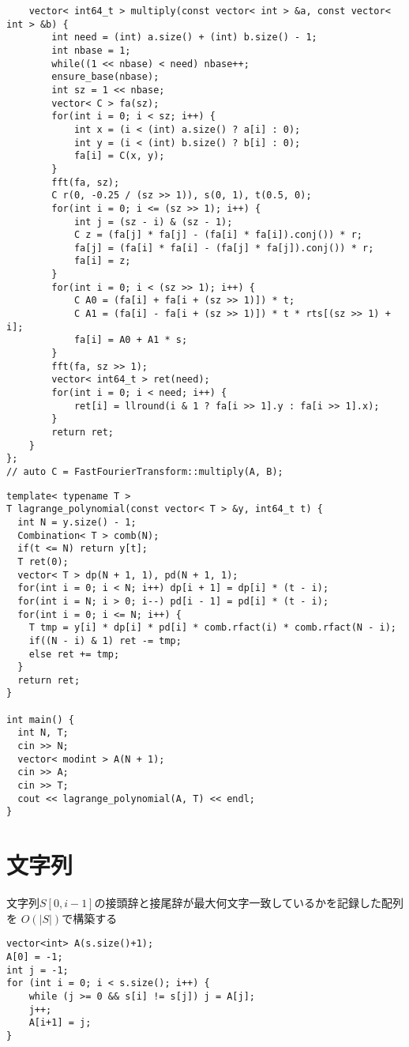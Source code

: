 \documentclass[11pt,a4paper]{jsarticle}
\newcommand{\minititle}[1]{\medskip{\large \sf #1}\medskip}
\begin{document}
\begin{lstlisting}
    vector< int64_t > multiply(const vector< int > &a, const vector< int > &b) {
        int need = (int) a.size() + (int) b.size() - 1;
        int nbase = 1;
        while((1 << nbase) < need) nbase++;
        ensure_base(nbase);
        int sz = 1 << nbase;
        vector< C > fa(sz);
        for(int i = 0; i < sz; i++) {
            int x = (i < (int) a.size() ? a[i] : 0);
            int y = (i < (int) b.size() ? b[i] : 0);
            fa[i] = C(x, y);
        }
        fft(fa, sz);
        C r(0, -0.25 / (sz >> 1)), s(0, 1), t(0.5, 0);
        for(int i = 0; i <= (sz >> 1); i++) {
            int j = (sz - i) & (sz - 1);
            C z = (fa[j] * fa[j] - (fa[i] * fa[i]).conj()) * r;
            fa[j] = (fa[i] * fa[i] - (fa[j] * fa[j]).conj()) * r;
            fa[i] = z;
        }
        for(int i = 0; i < (sz >> 1); i++) {
            C A0 = (fa[i] + fa[i + (sz >> 1)]) * t;
            C A1 = (fa[i] - fa[i + (sz >> 1)]) * t * rts[(sz >> 1) + i];
            fa[i] = A0 + A1 * s;
        }
        fft(fa, sz >> 1);
        vector< int64_t > ret(need);
        for(int i = 0; i < need; i++) {
            ret[i] = llround(i & 1 ? fa[i >> 1].y : fa[i >> 1].x);
        }
        return ret;
    }
};
// auto C = FastFourierTransform::multiply(A, B);
\end{lstlisting}

\minititle{Lagrange補間}
\begin{lstlisting}
template< typename T >
T lagrange_polynomial(const vector< T > &y, int64_t t) {
  int N = y.size() - 1;
  Combination< T > comb(N);
  if(t <= N) return y[t];
  T ret(0);
  vector< T > dp(N + 1, 1), pd(N + 1, 1);
  for(int i = 0; i < N; i++) dp[i + 1] = dp[i] * (t - i);
  for(int i = N; i > 0; i--) pd[i - 1] = pd[i] * (t - i);
  for(int i = 0; i <= N; i++) {
    T tmp = y[i] * dp[i] * pd[i] * comb.rfact(i) * comb.rfact(N - i);
    if((N - i) & 1) ret -= tmp;
    else ret += tmp;
  }
  return ret;
}

int main() {
  int N, T;
  cin >> N;
  vector< modint > A(N + 1);
  cin >> A;
  cin >> T;
  cout << lagrange_polynomial(A, T) << endl;
}
\end{lstlisting}

\section{文字列}
\minititle{KMP法}

文字列$S[0,i-1]$の接頭辞と接尾辞が最大何文字一致しているかを記録した配列を $O(|S|)$で構築する
\begin{lstlisting}
vector<int> A(s.size()+1);
A[0] = -1;
int j = -1;
for (int i = 0; i < s.size(); i++) {
    while (j >= 0 && s[i] != s[j]) j = A[j];
    j++;
    A[i+1] = j;
}
\end{lstlisting}
\end{document}
